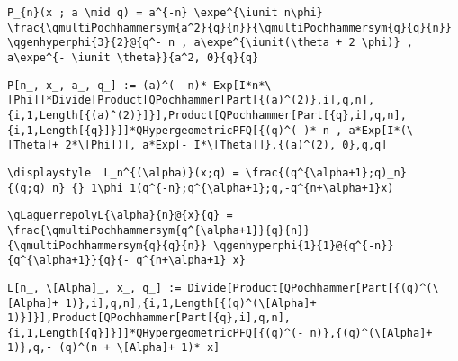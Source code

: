 \newsavebox\DLST
\begin{lrbox}{\DLST}
 \begin{minipage}[t]{0.82\textwidth}
  \lstinline[language={[latex]TeX},mathescape,breaklines=true]"P_{n}(x ; a \mid q) = a^{-n} \expe^{\iunit n\phi} \frac{\qmultiPochhammersym{a^2}{q}{n}}{\qmultiPochhammersym{q}{q}{n}} \qgenhyperphi{3}{2}@{q^- n , a\expe^{\iunit(\theta + 2 \phi)} , a\expe^{- \iunit \theta}}{a^2, 0}{q}{q}"
 \end{minipage}
\end{lrbox}
\newsavebox\DLMM
\begin{lrbox}{\DLMM}
 \begin{minipage}[t]{0.82\textwidth}
  \lstinline[language={[latex]TeX},mathescape,breaklines=true]"P[n_, x_, a_, q_] := (a)^(- n)* Exp[I*n*\[Phi]]*Divide[Product[QPochhammer[Part[{(a)^(2)},i],q,n],{i,1,Length[{(a)^(2)}]}],Product[QPochhammer[Part[{q},i],q,n],{i,1,Length[{q}]}]]*QHypergeometricPFQ[{(q)^(-)* n , a*Exp[I*(\[Theta]+ 2*\[Phi])], a*Exp[- I*\[Theta]]},{(a)^(2), 0},q,q]"
 \end{minipage}
\end{lrbox}
\newsavebox\DLMA
\begin{lrbox}{\DLMA}
 \begin{minipage}[t]{0.82\textwidth}
  \lstinline[language={[latex]TeX},mathescape,breaklines=true]""
 \end{minipage}
\end{lrbox}
\newsavebox\DMT
\begin{lrbox}{\DMT}
 \begin{minipage}[t]{0.82\textwidth}
  \lstinline[language={[latex]TeX},mathescape,breaklines=true]"\displaystyle  L_n^{(\alpha)}(x;q) = \frac{(q^{\alpha+1};q)_n}{(q;q)_n} {}_1\phi_1(q^{-n};q^{\alpha+1};q,-q^{n+\alpha+1}x)"
 \end{minipage}
\end{lrbox}
\newsavebox\DMST
\begin{lrbox}{\DMST}
 \begin{minipage}[t]{0.82\textwidth}
  \lstinline[language={[latex]TeX},mathescape,breaklines=true]"\qLaguerrepolyL{\alpha}{n}@{x}{q} = \frac{\qmultiPochhammersym{q^{\alpha+1}}{q}{n}}{\qmultiPochhammersym{q}{q}{n}} \qgenhyperphi{1}{1}@{q^{-n}}{q^{\alpha+1}}{q}{- q^{n+\alpha+1} x}"
 \end{minipage}
\end{lrbox}
\newsavebox\DMMM
\begin{lrbox}{\DMMM}
 \begin{minipage}[t]{0.82\textwidth}
  \lstinline[language={[latex]TeX},mathescape,breaklines=true]"L[n_, \[Alpha]_, x_, q_] := Divide[Product[QPochhammer[Part[{(q)^(\[Alpha]+ 1)},i],q,n],{i,1,Length[{(q)^(\[Alpha]+ 1)}]}],Product[QPochhammer[Part[{q},i],q,n],{i,1,Length[{q}]}]]*QHypergeometricPFQ[{(q)^(- n)},{(q)^(\[Alpha]+ 1)},q,- (q)^(n + \[Alpha]+ 1)* x]"
 \end{minipage}
\end{lrbox}

